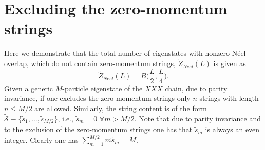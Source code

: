 \documentclass[11pt]{iopart}
\begin{document}
\section{Excluding the zero-momentum strings}
\label{app-2}

Here we demonstrate that the total number of eigenstates with nonzero N\'eel overlap, 
which do not contain zero-momentum strings, $\widetilde Z_{Neel}(L)$ is given as 
%
\begin{equation}
\widetilde Z_{Neel}(L)=B\Big(\frac{L}{2},\frac{L}{4}\Big). 
\end{equation}
%
Given a generic $M$-particle eigenstate of the $XXX$ chain, due to parity invariance, 
if one excludes the zero-momentum strings only $n$-strings with length $n\le M/2$ 
are allowed. Similarly, the string content is of the form $\widetilde{\mathcal S}
\equiv\{\tilde s_1,\dots,\tilde s_{M/2}\}$, i.e., $\tilde s_m=0$ $\forall m>M/2$.
Note that due to parity invariance and to the exclusion of the zero-momentum strings 
one has that $\tilde s_m$ is always an even integer. Clearly one has $\sum_{m=1}^{M/2}
m \tilde s_m=M$. 
\end{document}
